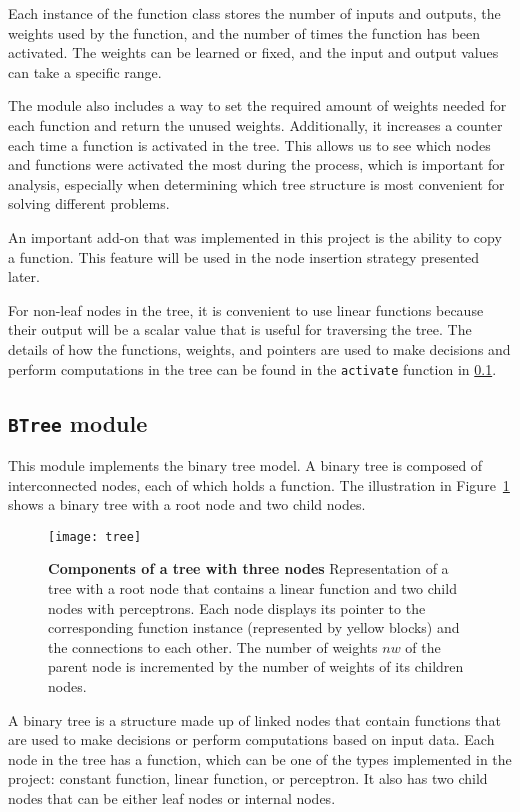 Each instance of the function class stores the number of inputs and outputs, the weights used by the function, and the number of times the function has been activated. The weights can be learned or fixed, and the input and output values can take a specific range.

The module also includes a way to set the required amount of weights needed for each function and return the unused weights. Additionally, it increases a counter each time a function is activated in the tree. This allows us to see which nodes and functions were activated the most during the process, which is important for analysis, especially when determining which tree structure is most convenient for solving different problems.

An important add-on that was implemented in this project is the ability to copy a function. This feature will be used in the node insertion strategy presented later.

For non-leaf nodes in the tree, it is convenient to use linear functions because their output will be a scalar value that is useful for traversing the tree. The details of how the functions, weights, and pointers are used to make decisions and perform computations in the tree can be found in the \texttt{activate} function in \ref{binary_tree}.

\subsection{\texttt{BTree} module}

\label{binary_tree}
This module implements the binary tree model. A binary tree is composed of interconnected nodes, each of which holds a function. The illustration in Figure~\ref{fig:tree_composition} shows a binary tree with a root node and two child nodes.
\begin{figure}[!ht]
\centering
\texttt{[image: tree]}
\caption[Components of a tree with three nodes]{
  \textbf{Components of a tree with three nodes}
Representation of a tree with a root node that contains a linear function and two child nodes with perceptrons. Each node displays its pointer to the corresponding function instance (represented by yellow blocks) and the connections to each other. The number of weights $nw$ of the parent node is incremented by the number of weights of its children nodes.
 }
\label{fig:tree_composition}
\end{figure}
A binary tree is a structure made up of linked nodes that contain functions that are used to make decisions or perform computations based on input data. Each node in the tree has a function, which can be one of the types implemented in the project: constant function, linear function, or perceptron. It also has two child nodes that can be either leaf nodes or internal nodes.

